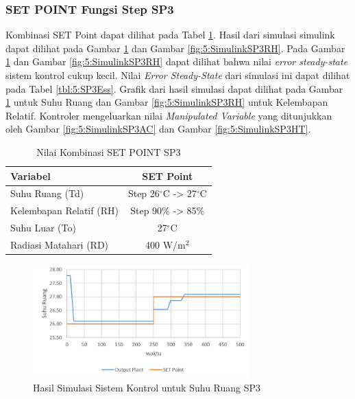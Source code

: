 \subsubsection{SET POINT Fungsi Step SP3}

Kombinasi SET Point dapat dilihat pada Tabel \ref{tbl:5:SP3Combination}. Hasil dari simulasi simulink dapat dilihat pada Gambar \ref{fig:5:SimulinkSP3Td} dan Gambar \ref{fig:5:SimulinkSP3RH}. Pada Gambar \ref{fig:5:SimulinkSP3Td} dan Gambar \ref{fig:5:SimulinkSP3RH} dapat dilihat bahwa nilai \textit{error steady-state} sistem kontrol cukup kecil. Nilai \textit{Error Steady-State} dari simulasi ini dapat dilihat pada Tabel \ref{tbl:5:SP3Ess}. Grafik dari hasil simulasi dapat dilihat pada Gambar \ref{fig:5:SimulinkSP3Td} untuk Suhu Ruang dan Gambar \ref{fig:5:SimulinkSP3RH} untuk Kelembapan Relatif. Kontroler mengeluarkan nilai \textit{Manipulated Variable} yang ditunjukkan oleh Gambar \ref{fig:5:SimulinkSP3AC} dan Gambar \ref{fig:5:SimulinkSP3HT}.

\begin{table}[!h]
	\caption{Nilai Kombinasi SET POINT SP3}
	\label{tbl:5:SP3Combination}
	\centering
	\begin{tabular}{|l|c|}
		\hline
		\textbf{Variabel} & \textbf{SET Point} \\ \hline
		Suhu Ruang (Td) & Step 26$^\circ$C -> 27$^\circ$C \\ \hline
		Kelembapan Relatif (RH) & Step 90\% -> 85\% \\ \hline
		Suhu Luar (To) & 27$^\circ$C           \\ \hline
		Radiasi Matahari (RD) & 400 W/m$^2$    \\ \hline
	\end{tabular}
\end{table}

\begin{figure}[!h]
	\centering
	\includegraphics[width=0.75\textwidth]{figures/SimulinkSP3Td}
	\caption{Hasil Simulasi Sistem Kontrol untuk Suhu Ruang SP3}
	\label{fig:5:SimulinkSP3Td}
\end{figure}

